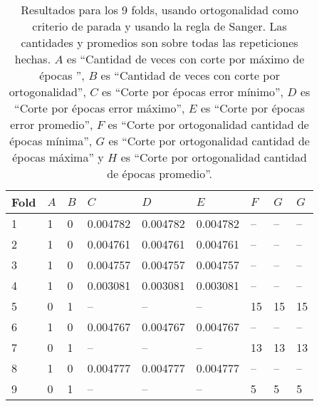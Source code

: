 \documentclass[informe.tex]{subfiles}
\begin{document}
      
      \begin{table}[h]
	\centering
	\begin{tabular}{|l|l|l|l|l|l|l|l|l|} \hline
	Fold & $A$ & $B$ & $C$ & $D$ & $E$ & $F$ & $G$ & $G$ \\ \hline
	1& 1 & 0 & 0.004782 & 0.004782 & 0.004782 & -- & -- & -- \\ \hline
	2& 1 & 0 & 0.004761 & 0.004761 & 0.004761 & -- & -- & -- \\ \hline
	3& 1 & 0 & 0.004757 & 0.004757 & 0.004757 & -- & -- & -- \\ \hline
	4& 1 & 0 & 0.003081 & 0.003081 & 0.003081 & -- & -- & -- \\ \hline
	5& 0 & 1 & -- & -- & -- & 15 & 15 & 15 \\ \hline
	6& 1 & 0 & 0.004767 & 0.004767 & 0.004767 & -- & -- & -- \\ \hline
	7& 0 & 1 & -- & -- & -- & 13 & 13 & 13 \\ \hline
	8& 1 & 0 & 0.004777 & 0.004777 & 0.004777 & -- & -- & -- \\ \hline
	9& 0 & 1 & -- & -- & -- & 5 & 5 & 5 \\ \hline
	\end{tabular}
	\caption{Resultados para los 9 folds, usando ortogonalidad como criterio de parada y usando la regla de Sanger. Las cantidades y promedios son sobre todas las repeticiones hechas. $A$ es ``Cantidad de veces con corte por máximo de épocas '', $B$ es ``Cantidad de veces con corte por ortogonalidad'', $C$ es ``Corte por épocas error mínimo'', $D$ es ``Corte por épocas error máximo'', $E$ es ``Corte por épocas error promedio'', $F$ es ``Corte por ortogonalidad cantidad de épocas mínima'', $G$ es ``Corte por ortogonalidad cantidad de épocas máxima'' y $H$ es ``Corte por ortogonalidad cantidad de épocas promedio''. }
	\label{tab:ortogonalidad_sanger}
      \end{table}
\end{document}
